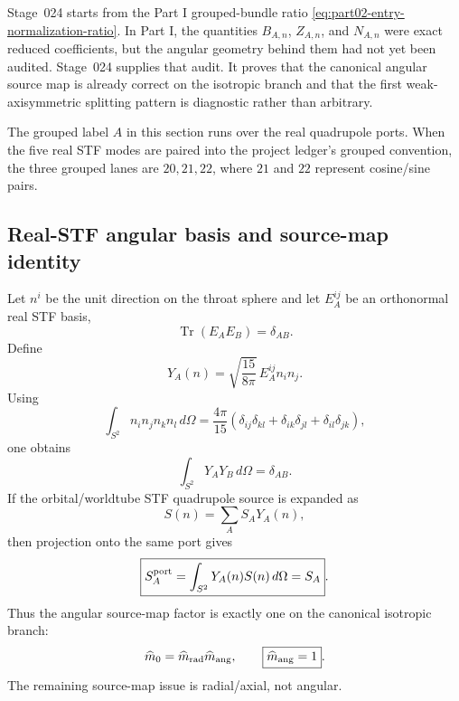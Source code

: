 Stage~024 starts from the Part I grouped-bundle ratio \eqref{eq:part02-entry-normalization-ratio}.  In Part I, the quantities \(B_{A,n}\), \(Z_{A,n}\), and \(N_{A,n}\) were exact reduced coefficients, but the angular geometry behind them had not yet been audited.  Stage~024 supplies that audit.  It proves that the canonical angular source map is already correct on the isotropic branch and that the first weak-axisymmetric splitting pattern is diagnostic rather than arbitrary.

The grouped label \(A\) in this section runs over the real quadrupole ports.  When the five real STF modes are paired into the project ledger's grouped convention, the three grouped lanes are \(20,21,22\), where \(21\) and \(22\) represent cosine/sine pairs.

\subsection{Real-STF angular basis and source-map identity}
\label{subsec:part02-real-stf-basis}

Let \(n^i\) be the unit direction on the throat sphere and let \(E_A^{ij}\) be an orthonormal real STF basis,
\begin{equation}
\operatorname{Tr}(E_AE_B)=\delta_{AB}.
\end{equation}
Define
\begin{equation}
\label{eq:part02-real-stf-harmonics}
Y_A(n)=\sqrt{\frac{15}{8\pi}}\,E_A^{ij}n_in_j.
\end{equation}
Using
\begin{equation}
\int_{S^2} n_in_jn_kn_l\,d\Omega
=
\frac{4\pi}{15}
\left(
\delta_{ij}\delta_{kl}
+\delta_{ik}\delta_{jl}
+\delta_{il}\delta_{jk}
\right),
\end{equation}
one obtains
\begin{equation}
\label{eq:part02-Y-orthonormal}
\boxed{
\int_{S^2}Y_A Y_B\,d\Omega=\delta_{AB}}.
\end{equation}
If the orbital/worldtube STF quadrupole source is expanded as
\begin{equation}
S(n)=\sum_A S_A Y_A(n),
\end{equation}
then projection onto the same port gives
\begin{equation}
\label{eq:part02-angular-source-map}
\boxed{
S_A^{\rm port}
=
\int_{S^2}Y_A(n)S(n)\,d\Omega
=S_A}.
\end{equation}
Thus the angular source-map factor is exactly one on the canonical isotropic branch:
\begin{equation}
\label{eq:part02-mhat-angular-one}
\widehat m_0=\widehat m_{\rm rad}\widehat m_{\rm ang},
\qquad
\boxed{\widehat m_{\rm ang}=1}.
\end{equation}
The remaining source-map issue is radial/axial, not angular.

